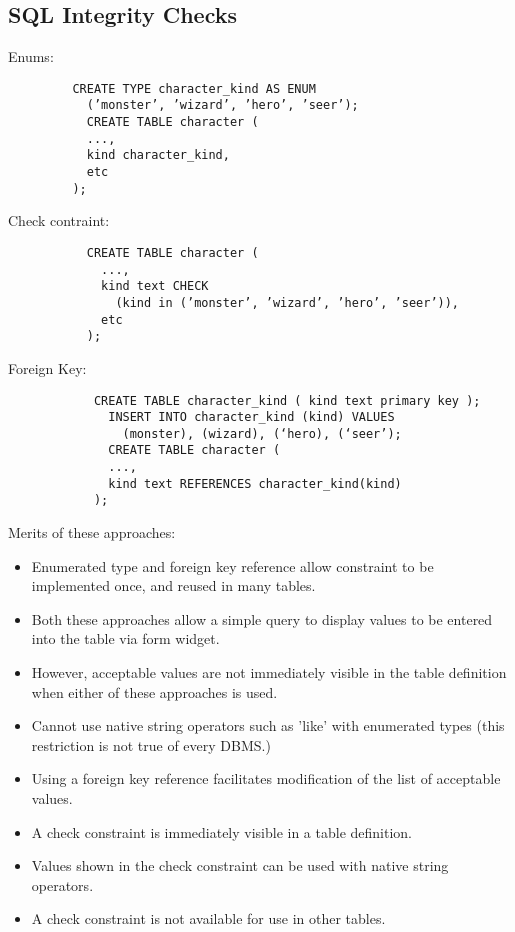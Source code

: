 \documentclass[10pt]{article}
\begin{document}
     \subsection*{SQL Integrity Checks}
       Enums: 
         \begin{verbatim}
         CREATE TYPE character_kind AS ENUM
           (’monster’, ’wizard’, ’hero’, ’seer’);
           CREATE TABLE character (
           ...,
           kind character_kind,
           etc
         );
         \end{verbatim}
       Check contraint:
         \begin{verbatim}
           CREATE TABLE character (
             ...,
             kind text CHECK
               (kind in (’monster’, ’wizard’, ’hero’, ’seer’)),
             etc
           );
         \end{verbatim}
        Foreign Key:
          \begin{verbatim}
            CREATE TABLE character_kind ( kind text primary key );
              INSERT INTO character_kind (kind) VALUES
                (monster), (wizard), (‘hero), (‘seer’);
              CREATE TABLE character (
              ...,
              kind text REFERENCES character_kind(kind)
            );
          \end{verbatim}
         Merits of these approaches:
         \begin{itemize}
            \item Enumerated type and foreign key reference allow constraint to be implemented once, and reused in many tables.
            \item Both these approaches allow a simple query to display values to be entered into the table via form widget.
            \item However, acceptable values are not immediately visible in the table definition when either of these approaches is used.
            \item Cannot use native string operators such as ’like’ with enumerated types (this restriction is not true of every DBMS.)
            \item Using a foreign key reference facilitates modification of the list of acceptable values.
            \item A check constraint is immediately visible in a table definition.
            \item Values shown in the check constraint can be used with native string operators.
            \item A check constraint is not available for use in other tables.
         \end{itemize}
\end{document}
